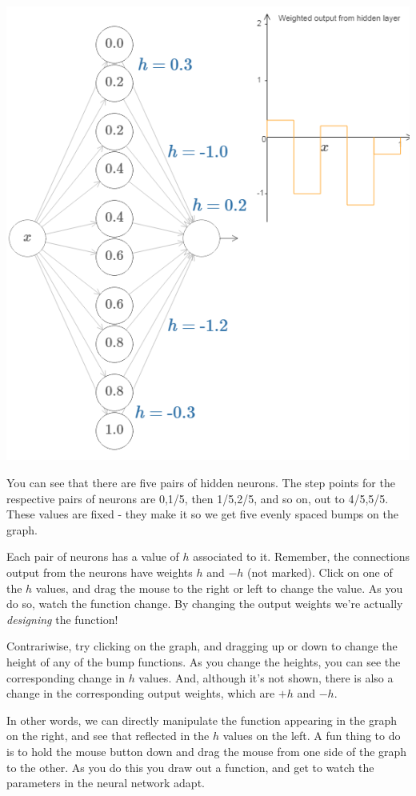{\centering \includegraphics[width=\textwidth,]{pic/wigglyfn16.png} \par}

You can see that there are five pairs of hidden neurons. The step points for the respective pairs of neurons are 0,1/5, then 1/5,2/5, and so on, out to 4/5,5/5. These values are fixed - they make it so we get five evenly spaced bumps on the graph.

Each pair of neurons has a value of $h$ associated to it. Remember, the connections output from the neurons have weights $h$ and $-h$ (not marked). Click on one of the $h$
values, and drag the mouse to the right or left to change the value. As you do so, watch the function change. By changing the output weights we're actually \textit{designing} the function!

Contrariwise, try clicking on the graph, and dragging up or down to change the height of any of the bump functions. As you change the heights, you can see the corresponding change in $h$ values. And, although it's not shown, there is also a change in the corresponding output weights, which are $+h$ and $-h$.

In other words, we can directly manipulate the function appearing in the graph on the right, and see that reflected in the $h$ values on the left. A fun thing to do is to hold the mouse button down and drag the mouse from one side of the graph to the other. As you do this you draw out a function, and get to watch the parameters in the neural network adapt.

